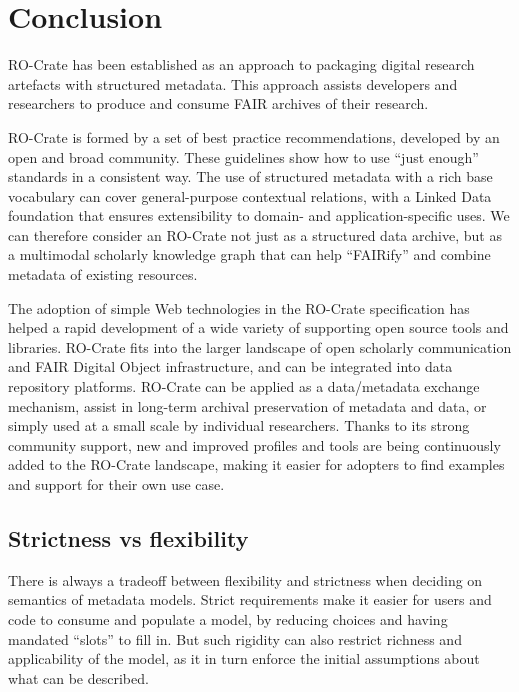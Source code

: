 \documentclass[ds,v1.1.2,openaccess]{iosart2x}%
\begin{document}
\section{Conclusion}

\label{sec:conclusion}

RO-Crate has been established as an approach to packaging digital
research artefacts with structured metadata. This approach assists
developers and researchers to produce and consume FAIR archives of
their research.

RO-Crate is formed by a set of best practice recommendations, developed
by an open and broad community. These guidelines show how to use ``just
enough'' standards in a consistent way. The use of
structured metadata with a rich base vocabulary can cover
general-purpose contextual relations, with a Linked Data foundation
that ensures extensibility to domain- and application-specific uses. We
can therefore consider an RO-Crate not just as a structured data
archive, but as a multimodal scholarly knowledge graph that can help
``FAIRify'' and combine metadata of existing resources.

The adoption of simple Web technologies in the RO-Crate specification
has helped a rapid development of a wide variety of supporting open
source tools and libraries. RO-Crate fits into the larger landscape of
open scholarly communication and FAIR Digital Object infrastructure,
and can be integrated into data repository platforms. RO-Crate can be
applied as a data/metadata exchange mechanism, assist in long-term
archival preservation of metadata and data, or simply used at a small
scale by individual researchers. Thanks to its strong community
support, new and improved profiles and tools are being continuously
added to the RO-Crate landscape, making it easier for adopters
to find examples and support for their own use case.

\subsection{Strictness vs flexibility}

There is always a tradeoff between flexibility and strictness
\cite{doi:10.1007/s11042-009-0397-2} when deciding on semantics of metadata
models. Strict requirements make it easier for users and code to
consume and populate a model, by reducing choices and having mandated
``slots'' to fill in. But such rigidity can also restrict richness and
applicability of the model, as it in turn enforce the initial
assumptions about what can be described.
\end{document}

